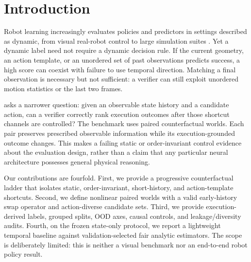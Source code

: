 \section{Introduction}
Robot learning increasingly evaluates policies and predictors in settings described as dynamic, from visual real-robot control to large simulation suites \cite{brohan2022rt1,nasiriany2024robocasa}. Yet a dynamic label need not require a dynamic decision rule. If the current geometry, an action template, or an unordered set of past observations predicts success, a high score can coexist with failure to use temporal direction. Matching a final observation is necessary but not sufficient: a verifier can still exploit unordered motion statistics or the last two frames.

\bench asks a narrower question: given an observable state history and a candidate action, can a verifier correctly rank execution outcomes after those shortcut channels are controlled? The benchmark uses paired counterfactual worlds. Each pair preserves prescribed observable information while its execution-grounded outcome changes. This makes a failing static or order-invariant control evidence about the evaluation design, rather than a claim that any particular neural architecture possesses general physical reasoning.

Our contributions are fourfold. First, we provide a progressive counterfactual ladder that isolates static, order-invariant, short-history, and action-template shortcuts. Second, we define nonlinear paired worlds with a valid early-history swap operator and action-diverse candidate sets. Third, we provide execution-derived labels, grouped splits, OOD axes, causal controls, and leakage/diversity audits. Fourth, on the frozen state-only protocol, we report a lightweight temporal baseline against validation-selected fair analytic estimators. The scope is deliberately limited: this is neither a visual benchmark nor an end-to-end robot policy result.
